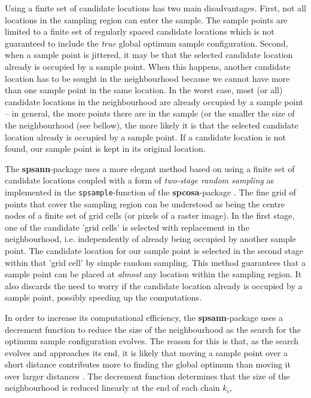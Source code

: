 Using a finite set of candidate locations has two main disadvantages. First, not
all locations in the sampling region can enter the sample. The sample points are
limited to a finite set of regularly spaced candidate locations which is not 
guaranteed to include the \textit{true} global optimum sample configuration. 
Second, when a sample point is jittered, it may be that the selected candidate 
location already is occupied by a sample point. When this happens, another 
candidate location has to be sought in the neighbourhood because we cannot have 
more than one sample point in the same location. In the worst case, most (or 
all) candidate locations in the neighbourhood are already occupied by a sample 
point -- in general, the more points there are in the sample (or the smaller 
the size of the neighbourhood (see bellow), the more likely it is that the 
selected candidate location already is occupied by a sample point. If a 
candidate location is not found, our sample point is kept in its original 
location.

The \textbf{spsann}-package uses a more elegant method based on using a finite
set of candidate locations coupled with a form of \textit{two-stage random 
sampling} as implemented in the \texttt{spsample}-function of the 
\textbf{spcosa}-package \citep{WalvoortEtAl2010}. The fine grid of points that 
cover the sampling region can be understood as being the centre nodes of a 
finite set of grid cells (or pixels of a raster image). In the first stage, one 
of the candidate 'grid cells' is selected with replacement in the neighbourhood,
i.e. independently of already being occupied by another sample point. The 
candidate location for our sample point is selected in the second stage within 
that 'grid cell' by simple random sampling. This method guarantees that a sample
 point can be placed at \textit{almost} any location within the sampling region.
It also discards the need to worry if the candidate location already is occupied
by a sample point, possibly speeding up the computations.

In order to increase its computational efficiency, the \textbf{spsann}-package 
uses a decrement function to reduce the size of the neighbourhood as the search
for the optimum sample configuration evolves. The reason for this is that, as 
the search evolves and approaches its end, it is likely that moving a sample 
point over a short distance contributes more to finding the global optimum than 
moving it over larger distances \citep{GroenigenEtAl1998}. The decrement 
function determines that the size of the neighbourhood is reduced linearly at 
the end of each chain $k_i$,

